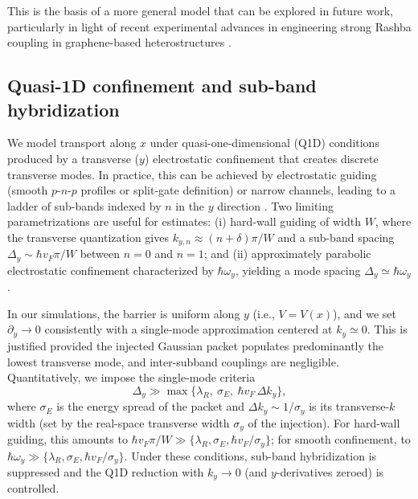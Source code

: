 This is the basis of a more general model that can be explored in future work, particularly in light of recent experimental advances in engineering strong Rashba coupling in graphene-based heterostructures \cite{ManchonNatureMater2015}.

\subsection{Quasi-1D confinement and sub-band hybridization}\label{subsec:q1d-confinement-hybridization}

We model transport along $x$ under quasi-one-dimensional (Q1D) conditions produced by a transverse ($y$) electrostatic confinement that creates discrete transverse modes.
In practice, this can be achieved by electrostatic guiding (smooth $p$-$n$-$p$ profiles or split-gate definition) or narrow channels, leading to a ladder of sub-bands indexed by $n$ in the $y$ direction \cite{Young2009, ParedesPhysRevB2021, TrauzettelNature2007}.
Two limiting parametrizations are useful for estimates:
(i) hard-wall guiding of width $W$, where the transverse quantization gives $k_{y,n}\approx (n+\delta)\pi/W$ and a sub-band spacing $\Delta_y\sim \hbar v_F\pi/W$ between $n=0$ and $n=1$; and
(ii) approximately parabolic electrostatic confinement characterized by $\hbar\omega_y$, yielding a mode spacing $\Delta_y\simeq \hbar\omega_y$.

In our simulations, the barrier is uniform along $y$ (i.e., $V=V(x)$), and we set $\partial_y\to 0$ consistently with a single-mode approximation centered at $k_y\simeq 0$.
This is justified provided the injected Gaussian packet populates predominantly the lowest transverse mode, and inter-subband couplings are negligible.
Quantitatively, we impose the single-mode criteria
\begin{equation*}
\Delta_y \gg \max\{\lambda_R,\ \sigma_E,\ \hbar v_F\,\Delta k_y\},
\end{equation*}
\noindent where $\sigma_E$ is the energy spread of the packet and $\Delta k_y\sim 1/\sigma_y$ is its transverse-$k$ width (set by the real-space transverse width $\sigma_y$ of the injection).
For hard-wall guiding, this amounts to $\hbar v_F\pi/W \gg \{\lambda_R,\sigma_E,\hbar v_F/\sigma_y\}$; for smooth confinement, to $\hbar\omega_y \gg \{\lambda_R,\sigma_E,\hbar v_F/\sigma_y\}$.
Under these conditions, sub-band hybridization is suppressed and the Q1D reduction with $k_y\to 0$ (and $y$-derivatives zeroed) is controlled.

